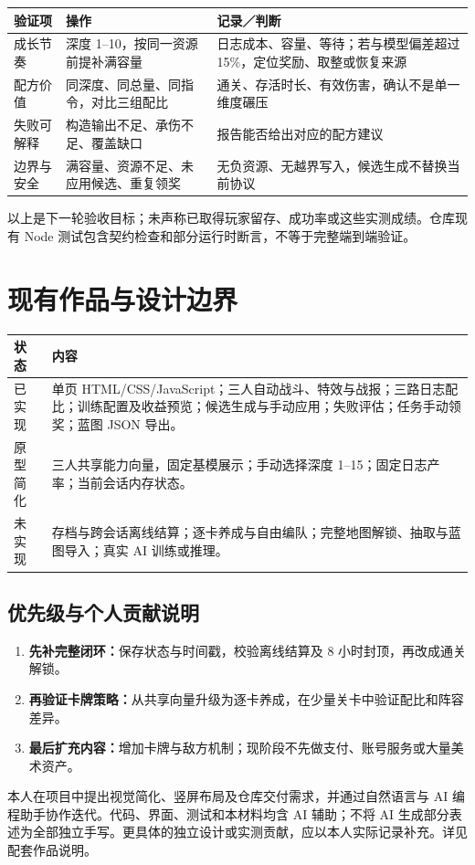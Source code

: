 \documentclass[UTF8,10pt,a4paper,fontset=fandol]{ctexart}
\newcommand{\note}[1]{{\small\color{ink}#1}}
\begin{document}
\begin{tabularx}{\linewidth}{@{}lYY@{}}\toprule
验证项 & 操作 & 记录／判断\\\midrule
成长节奏 & 深度 1--10，按同一资源前提补满容量 & 日志成本、容量、等待；若与模型偏差超过 15\%，定位奖励、取整或恢复来源\\
配方价值 & 同深度、同总量、同指令，对比三组配比 & 通关、存活时长、有效伤害，确认不是单一维度碾压\\
失败可解释 & 构造输出不足、承伤不足、覆盖缺口 & 报告能否给出对应的配方建议\\
边界与安全 & 满容量、资源不足、未应用候选、重复领奖 & 无负资源、无越界写入，候选生成不替换当前协议\\\bottomrule
\end{tabularx}
\note{以上是下一轮验收目标；未声称已取得玩家留存、成功率或这些实测成绩。仓库现有 Node 测试包含契约检查和部分运行时断言，不等于完整端到端验证。}

\section{现有作品与设计边界}
\begin{tabularx}{\linewidth}{@{}lY@{}}\toprule
状态 & 内容\\\midrule
已实现 & 单页 HTML/CSS/JavaScript；三人自动战斗、特效与战报；三路日志配比；训练配置及收益预览；候选生成与手动应用；失败评估；任务手动领奖；蓝图 JSON 导出。\\
原型简化 & 三人共享能力向量，固定基模展示；手动选择深度 1--15；固定日志产率；当前会话内存状态。\\
未实现 & 存档与跨会话离线结算；逐卡养成与自由编队；完整地图解锁、抽取与蓝图导入；真实 AI 训练或推理。\\\bottomrule
\end{tabularx}

\subsection{优先级与个人贡献说明}
\begin{enumerate}
\item \textbf{先补完整闭环：}保存状态与时间戳，校验离线结算及 8 小时封顶，再改成通关解锁。
\item \textbf{再验证卡牌策略：}从共享向量升级为逐卡养成，在少量关卡中验证配比和阵容差异。
\item \textbf{最后扩充内容：}增加卡牌与敌方机制；现阶段不先做支付、账号服务或大量美术资产。
\end{enumerate}
本人在项目中提出视觉简化、竖屏布局及仓库交付需求，并通过自然语言与 AI 编程助手协作迭代。代码、界面、测试和本材料均含 AI 辅助；不将 AI 生成部分表述为全部独立手写。更具体的独立设计或实测贡献，应以本人实际记录补充。详见配套作品说明。
\end{document}
